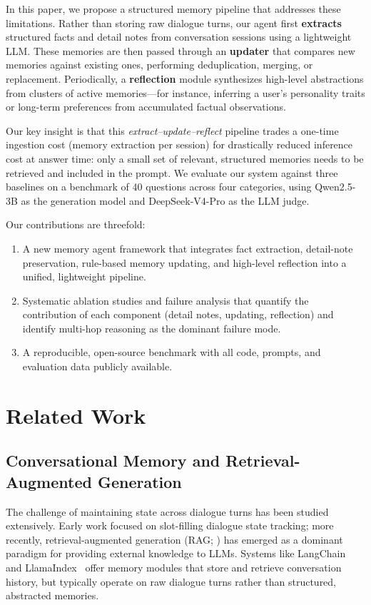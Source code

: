 \documentclass[11pt]{article}
\begin{document}
In this paper, we propose a structured memory pipeline that addresses these limitations. Rather than storing raw dialogue turns, our agent first \textbf{extracts} structured facts and detail notes from conversation sessions using a lightweight LLM. These memories are then passed through an \textbf{updater} that compares new memories against existing ones, performing deduplication, merging, or replacement. Periodically, a \textbf{reflection} module synthesizes high-level abstractions from clusters of active memories---for instance, inferring a user's personality traits or long-term preferences from accumulated factual observations.

Our key insight is that this \textit{extract--update--reflect} pipeline trades a one-time ingestion cost (memory extraction per session) for drastically reduced inference cost at answer time: only a small set of relevant, structured memories needs to be retrieved and included in the prompt. We evaluate our system against three baselines on a benchmark of 40 questions across four categories, using Qwen2.5-3B as the generation model and DeepSeek-V4-Pro as the LLM judge.

Our contributions are threefold:
\begin{enumerate}
    \item A new memory agent framework that integrates fact extraction, detail-note preservation, rule-based memory updating, and high-level reflection into a unified, lightweight pipeline.
    \item Systematic ablation studies and failure analysis that quantify the contribution of each component (detail notes, updating, reflection) and identify multi-hop reasoning as the dominant failure mode.
    \item A reproducible, open-source benchmark with all code, prompts, and evaluation data publicly available.
\end{enumerate}

\section{Related Work}

\subsection{Conversational Memory and Retrieval-Augmented Generation}

The challenge of maintaining state across dialogue turns has been studied extensively. Early work focused on slot-filling dialogue state tracking; more recently, retrieval-augmented generation (RAG; \cite{lewis2020rag}) has emerged as a dominant paradigm for providing external knowledge to LLMs. Systems like LangChain~\cite{langchain2024} and LlamaIndex~\cite{llamaindex2024} offer memory modules that store and retrieve conversation history, but typically operate on raw dialogue turns rather than structured, abstracted memories.
\end{document}
